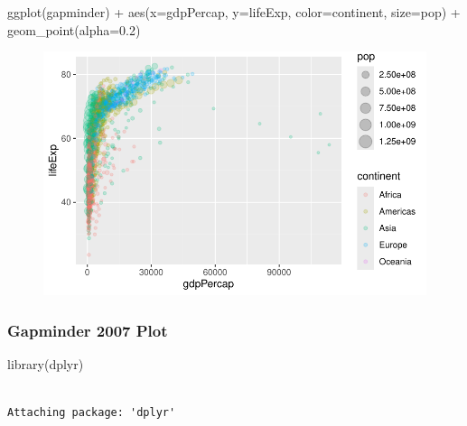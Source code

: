\documentclass[
  letterpaper,
  DIV=11,
  numbers=noendperiod]{scrartcl}
\newenvironment{Shaded}{\begin{snugshade}}{\end{snugshade}}
\newcommand{\AttributeTok}[1]{\textcolor[rgb]{0.40,0.45,0.13}{#1}}
\newcommand{\FloatTok}[1]{\textcolor[rgb]{0.68,0.00,0.00}{#1}}
\newcommand{\FunctionTok}[1]{\textcolor[rgb]{0.28,0.35,0.67}{#1}}
\newcommand{\NormalTok}[1]{\textcolor[rgb]{0.00,0.23,0.31}{#1}}
\newcommand{\SpecialCharTok}[1]{\textcolor[rgb]{0.37,0.37,0.37}{#1}}
\begin{document}
\begin{Shaded}
\begin{Highlighting}[]
\FunctionTok{ggplot}\NormalTok{(gapminder) }\SpecialCharTok{+}
  \FunctionTok{aes}\NormalTok{(}\AttributeTok{x=}\NormalTok{gdpPercap, }\AttributeTok{y=}\NormalTok{lifeExp, }\AttributeTok{color=}\NormalTok{continent, }\AttributeTok{size=}\NormalTok{pop) }\SpecialCharTok{+}
  \FunctionTok{geom\_point}\NormalTok{(}\AttributeTok{alpha=}\FloatTok{0.2}\NormalTok{)}
\end{Highlighting}
\end{Shaded}

\begin{figure}[H]

{\centering \includegraphics{Class05_files/figure-pdf/unnamed-chunk-28-1.pdf}

}

\end{figure}

\hypertarget{gapminder-2007-plot}{%
\subsubsection{Gapminder 2007 Plot}\label{gapminder-2007-plot}}

\begin{Shaded}
\begin{Highlighting}[]
\FunctionTok{library}\NormalTok{(dplyr)}
\end{Highlighting}
\end{Shaded}

\begin{verbatim}

Attaching package: 'dplyr'
\end{verbatim}
\end{document}
